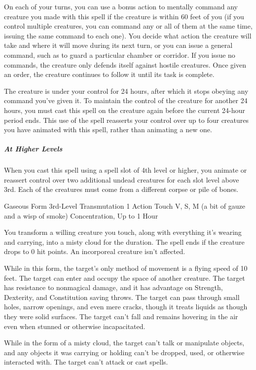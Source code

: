{On each of your turns, you can use a bonus action to mentally command any creature you made with this spell if the creature is within 60 feet of you (if you control multiple creatures, you can command any or all of them at the same time, issuing the same command to each one). You decide what action the creature will take and where it will move during its next turn, or you can issue a general command, such as to guard a particular chamber or corridor. If you issue no commands, the creature only defends itself against hostile creatures. Once given an order, the creature continues to follow it until its task is complete.

The creature is under your control for 24 hours, after which it stops obeying any command you've given it. To maintain the control of the creature for another 24 hours, you must cast this spell on the creature again before the current 24-hour period ends. This use of the spell reasserts your control over up to four creatures you have animated with this spell, rather than animating a new one.

\subparagraph*{At Higher Levels} When you cast this spell using a spell slot of 4th level or higher, you animate or reassert control over two additional undead creatures for each slot level above 3rd. Each of the creatures must come from a different corpse or pile of bones.

\DndSpellHeader
  {Gaseous Form}
  {3rd-Level Transmutation}
  {1 Action}
  {Touch}
  {V, S, M (a bit of gauze and a wisp of smoke)}
  {Concentration, Up to 1 Hour}

You transform a willing creature you touch, along with everything it’s wearing and carrying, into a misty cloud for the duration. The spell ends if the creature drops to 0 hit points. An incorporeal creature isn’t affected.

While in this form, the target’s only method of movement is a flying speed of 10 feet. The target can enter and occupy the space of another creature. The target has resistance to nonmagical damage, and it has advantage on Strength, Dexterity, and Constitution saving throws. The target can pass through small holes, narrow openings, and even mere cracks, though it treats liquids as though they were solid surfaces. The target can’t fall and remains hovering in the air even when stunned or otherwise incapacitated.

While in the form of a misty cloud, the target can’t talk or manipulate objects, and any objects it was carrying or holding can’t be dropped, used, or otherwise interacted with. The target can’t attack or cast spells.

}
